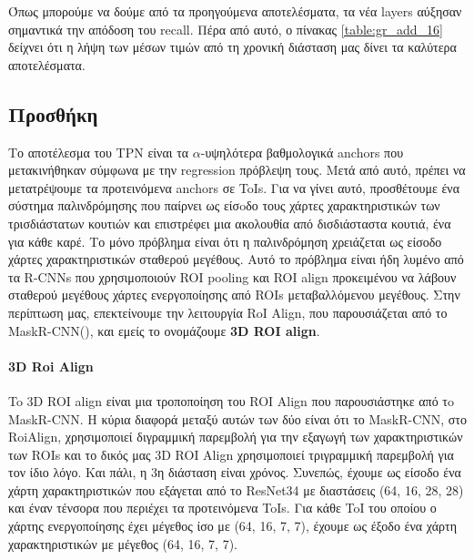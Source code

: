 Όπως μπορούμε να δούμε από τα προηγούμενα αποτελέσματα, τα νέα \en layers \gr αύξησαν σημαντικά την απόδοση του \en recall\gr. Πέρα από αυτό, ο πίνακας \ref{table:gr_add_16} δείχνει ότι
η λήψη των μέσων τιμών από τη χρονική διάσταση μας δίνει τα καλύτερα αποτελέσματα.


\subsection{Προσθήκη }
Το αποτέλεσμα του \en TPN  \gr είναι τα $\alpha$-υψηλότερα βαθμολογικά \en anchors \gr που μετακινήθηκαν σύμφωνα με την \en regression \gr πρόβλεψη τους. Μετά από αυτό, πρέπει να μετατρέψουμε τα
προτεινόμενα \en anchors \gr σε \en ToIs\gr.
Για να γίνει αυτό, προσθέτουμε ένα σύστημα παλινδρόμησης που παίρνει ως είσoδο τους χάρτες χαρακτηριστικών των τρισδιάστατων κουτιών και επιστρέφει μια ακολουθία από δισδιάσταστα κουτιά,
ένα για κάθε καρέ.
Το μόνο πρόβλημα είναι ότι η παλινδρόμηση χρειάζεται ως είσοδο χάρτες χαρακτηριστικών  σταθερού μεγέθους. Αυτό το πρόβλημα είναι ήδη λυμένο από τα \en R-CNNs  \gr που χρησιμοποιούν \en ROI pooling \gr
και \en ROI align \gr προκειμένου να λάβουν σταθερού μεγέθους χάρτες ενεργοποίησης από \en ROIs \gr μεταβαλλόμενου μεγέθους. Στην περίπτωση μας, επεκτείνουμε την λειτουργία \en RoI Align\gr ,
που παρουσιάζεται από το \en MaskR-CNN(\cite{DBLP:journals/corr/HeGDG17})\gr, και εμείς το ονομάζουμε \en\textbf{3D ROI align}.
\paragraph{3D Roi Align}
\en To  \en 3D ROI align \gr είναι μια τροποποίηση του \en ROI Align \gr που παρουσιάστηκε από τo \en MaskR-CNN\gr. Η κύρια διαφορά μεταξύ αυτών των δύο είναι ότι το
\en MaskR-CNN\gr, στο \en RoiAlign\gr,  χρησιμοποιεί διγραμμική παρεμβολή για την εξαγωγή των χαρακτηριστικών των \en ROIs \gr και το δικός μας \en 3D ROI Align \gr χρησιμοποιεί
τριγραμμική παρεμβολή για τον ίδιο λόγο. Και πάλι, η 3η διάσταση είναι χρόνος.
Συνεπώς, έχουμε ως είσοδο ένα χάρτη χαρακτηριστικών που εξάγεται από το \en  ResNet34  \gr με διαστάσεις (64, 16, 28, 28) και έναν τένσορα που περιέχει τα προτεινόμενα \en ToIs\gr.
Για κάθε \en ToI \gr του οποίου ο χάρτης ενεργοποίησης έχει μέγεθος ίσο με (64, 16, 7, 7), έχουμε ως έξοδο ένα χάρτη χαρακτηριστικών με μέγεθος (64, 16, 7, 7).  \par

